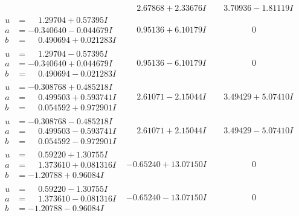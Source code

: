 \documentclass[1p]{elsarticle_modified}
\theoremstyle{definition}
\begin{document}
$$\begin{array}{c|c|c}
 & \phantom{-}2.67868 + 2.33676 I & \phantom{-}3.70936 - 1.81119 I \\ \hline\begin{aligned}
u &= \phantom{-}1.29704 + 0.57395 I \\
a &= -0.340640 - 0.044679 I \\
b &= \phantom{-}0.490694 + 0.021283 I\end{aligned}
 & \phantom{-}0.95136 + 6.10179 I & \phantom{-0.000000 } 0 \\ \hline\begin{aligned}
u &= \phantom{-}1.29704 - 0.57395 I \\
a &= -0.340640 + 0.044679 I \\
b &= \phantom{-}0.490694 - 0.021283 I\end{aligned}
 & \phantom{-}0.95136 - 6.10179 I & \phantom{-0.000000 } 0 \\ \hline\begin{aligned}
u &= -0.308768 + 0.485218 I \\
a &= \phantom{-}0.499503 + 0.593741 I \\
b &= \phantom{-}0.054592 + 0.972901 I\end{aligned}
 & \phantom{-}2.61071 - 2.15044 I & \phantom{-}3.49429 + 5.07410 I \\ \hline\begin{aligned}
u &= -0.308768 - 0.485218 I \\
a &= \phantom{-}0.499503 - 0.593741 I \\
b &= \phantom{-}0.054592 - 0.972901 I\end{aligned}
 & \phantom{-}2.61071 + 2.15044 I & \phantom{-}3.49429 - 5.07410 I \\ \hline\begin{aligned}
u &= \phantom{-}0.59220 + 1.30755 I \\
a &= \phantom{-}1.373610 + 0.081316 I \\
b &= -1.20788 + 0.96084 I\end{aligned}
 & -0.65240 + 13.07150 I & \phantom{-0.000000 } 0 \\ \hline\begin{aligned}
u &= \phantom{-}0.59220 - 1.30755 I \\
a &= \phantom{-}1.373610 - 0.081316 I \\
b &= -1.20788 - 0.96084 I\end{aligned}
 & -0.65240 - 13.07150 I & \phantom{-0.000000 } 0 \\ \hline\begin{aligned}

\end{aligned}
\end{array}$$
\end{document}
